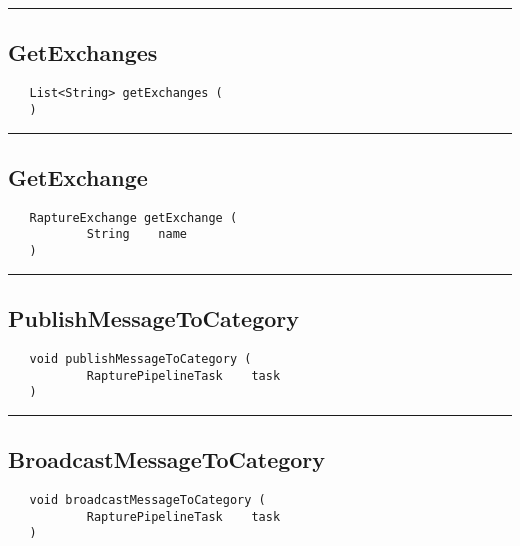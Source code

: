 \rule{15cm}{2pt}
\subsection{GetExchanges}
\label{Api:GetExchanges}
\begin{verbatim}
   List<String> getExchanges (
   )
\end{verbatim}



\rule{15cm}{2pt}
\subsection{GetExchange}
\label{Api:GetExchange}
\begin{verbatim}
   RaptureExchange getExchange (
           String    name
   )
\end{verbatim}



\rule{15cm}{2pt}
\subsection{PublishMessageToCategory}
\label{Api:PublishMessageToCategory}
\begin{verbatim}
   void publishMessageToCategory (
           RapturePipelineTask    task
   )
\end{verbatim}



\rule{15cm}{2pt}
\subsection{BroadcastMessageToCategory}
\label{Api:BroadcastMessageToCategory}
\begin{verbatim}
   void broadcastMessageToCategory (
           RapturePipelineTask    task
   )
\end{verbatim}



